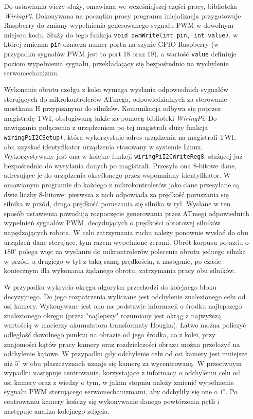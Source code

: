 Do ustawiania wieży służy, omawiana we wcześniejszej części pracy, biblioteka \textit{WiringPi}. Dokonywana na początku pracy programu inicjalizacja przygotowuje Raspberry do zmiany wypełnienia generowanego sygnału PWM w dowolnym miejscu kodu.  Służy do tego funkcja \texttt{void pwmWrite(int pin, int value)}, w której zmienna \texttt{pin} oznacza numer portu na szynie GPIO Raspberry (w przypadku sygnałów PWM jest to port 18 oraz 19), a wartość \texttt{value} definiuje poziom wypełnienia sygnału, przekładający się bezpośrednio na wychylenie serwomechanizmu.

Wykonanie obrotu czołgu z kolei wymaga wysłania odpowiednich sygnałów sterujących do mikrokontrolerów ATmega, odpowiedzialnych za sterowanie mostkami H przypisanymi do silników. Komunikacja odbywa się poprzez magistralę TWI, obsługiwaną także za pomocą biblioteki \textit{WiringPi}. Do nawiązania połączenia z urządzeniem po tej magistrali służy funkcja \texttt{wiringPiI2CSetup)}, która wykorzystuje adres urządzenia na magistrali TWI, abu uzyskać identyfikator urządzenia stosowany w systemie Linux. Wykorzystywany jest ona w kolejne funkcji \texttt{wiringPiI2CWriteReg8}, służącej już bezpośrednio do wysyłania danych po magistrali. Przesyła ona 8-bitowe dane, adresujące je do urządzenia określonego przez wspomniany identyfikator. W omawianym programie do każdego z mikrokontrolerów jako dane przesyłane są dwie liczby 8-bitowe: pierwsza z nich odpowiada za prędkość poruszania się silnika w przód, druga prędkość poruszania się silnika w tył. Wysłane w ten sposób ustawienia powodują rozpoczęcie generowania przez ATmegi odpowiednich wypełnień sygnałów PWM, decydujących o prędkości obrotowej silników napędzających robota. W celu zatrzymania ruchu należy ponownie wysłać do obu urządzeń dane sterujące, tym razem wypełnione zerami. Obrót korpusu pojazdu o $180^\circ$ polega więc na wysłaniu do mikrontrolerów polecenia obrotu jednego silnika w przód, a drugiego w tył z taką samą prędkością, a następnie, po czasie koniecznym dla wykonania żądanego obrotu, zatrzymania pracy obu silników.

W przypadku wykrycia okręgu algorytm przechodzi do kolejnego bloku decyzyjnego. Do jego rozpatrzenia wyliczane jest odchylenie znalezionego celu od osi kamery. Wykonywane jest ono na podstawie informacji o środku najlepszego znalezionego okręgu (przez "najlepszy" rozumiany jest okrąg z najwyższą wartością w macierzy akumulatora transformaty Hougha). Łatwo można policzyć odległość dowolnego punktu na obrazie od jego środka, co z kolei, przy znajomości kątów pracy kamery oraz rozdzielczości obrazu można przełożyć na odchylenie kątowe. W przypadku gdy odchylenie celu od osi kamery jest mniejsze niż $5^\circ$ w obu płaszczyznach uznaje się kamerę za wycentrowaną. W przeciwnym wypadku następuje centrowanie, korzystające z informacji o odchyleniu celu od osi kamery oraz z wiedzy o tym, w jakim stopniu należy zmienić wypełnienie sygnału PWM sterującego serwomechanizmami, aby odchyliły się one o $1^\circ$. Po centrowaniu kamery kończy się wykonywanie danego powtórzenia pętli i następuje analiza kolejnego zdjęcia.

